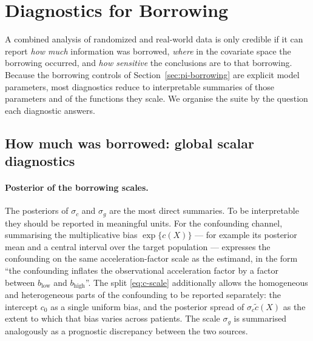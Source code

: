 \section{Diagnostics for Borrowing}
\label{sec:pi-diagnostics}

A combined analysis of randomized and real-world data is only credible if it
can report \emph{how much} information was borrowed, \emph{where} in the
covariate space the borrowing occurred, and \emph{how sensitive} the conclusions
are to that borrowing. Because the borrowing controls of
Section~\ref{sec:pi-borrowing} are explicit model parameters, most diagnostics
reduce to interpretable summaries of those parameters and of the functions they
scale. We organise the suite by the question each diagnostic answers.

\subsection{How much was borrowed: global scalar diagnostics}

\paragraph{Posterior of the borrowing scales.}
The posteriors of $\sigma_c$ and $\sigma_g$ are the most direct summaries. To be
interpretable they should be reported in meaningful units. For the confounding
channel, summarising the multiplicative bias $\exp\{c(X)\}$ --- for example its
posterior mean and a central interval over the target population --- expresses
the confounding on the same acceleration-factor scale as the estimand, in the
form ``the confounding inflates the observational acceleration factor by a
factor between $b_{\text{low}}$ and $b_{\text{high}}$''. The split
\eqref{eq:c-scale} additionally allows the homogeneous and heterogeneous parts
of the confounding to be reported separately: the intercept $c_0$ as a single
uniform bias, and the posterior spread of $\sigma_c \tilde c(X)$ as the extent
to which that bias varies across patients. The scale $\sigma_g$ is summarised
analogously as a prognostic discrepancy between the two sources.

